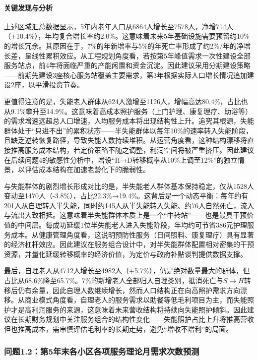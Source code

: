 \documentclass[UTF8]{ctexart}
\begin{document}
\paragraph{关键发现与分析}
上述区域汇总数据显示，5年内老年人口从6864人增长至7578人，净增714人（+10.4\%），年均复合增长率约2.0\%。这意味着未来5年基础设施需要预留约10\%的增长冗余。其原因在于，7\%的年新增率与5\%的年死亡率形成了约2\%/年的净增长差，呈线性累积效应。从工程规划角度看，若按第5年峰值需求一次性建设全部服务站点，前4年将面临严重的产能闲置和资金沉淀。因此建议采用分期建设策略——前期先建设3座核心服务站覆盖主要需求，第3年根据实际人口增长情况追加建设2座，以平滑投资节奏。

更值得注意的是，失能老人群体从624人激增至1126人，增幅高达80.4\%，占比也从9.1\%攀升至14.9\%。这意味着高成本照护服务（上门护理、康复理疗、助浴等）的需求增速远超总人口增速，人均服务成本将出现结构性上升。追究其根源，失能群体处于“只进不出”的累积状态——半失能群体以每年10\%的速率转入失能阶段，且缺乏逆转恢复路径，导致失能人数持续堆积。从运营角度看，这种结构漂移将直接推高服务成本结构，若定价策略不随之调整，利润空间将被严重挤压。因此建议在后续问题4的敏感性分析中，增设“H→D转移概率从10\%上调至12\%”的独立情景，以评估成本结构在加速老龄化下的脆弱性。

与失能群体的剧烈增长形成对比的是，半失能老人群体基本保持稳定，仅从1528人变动至1470人（-3.8\%），占比22.3\%→19.4\%。这背后是一个动态平衡：每年约有201人从自理转入半失能，同时约145人从半失能转入失能、约76人自然死亡，流入与流出大致相抵。这意味着半失能群体本质上是一个“中转站”——也是最具干预价值的中间层。每成功延缓1位半失能老人进入失能阶段，年均约可节省386元护理服务成本。从健康管理角度看，这说明预防性服务（日间照料、康复理疗）具有显著的经济杠杆效应。因此建议在服务组合设计中，对半失能群体配置相对密集的干预资源，并量化延缓转移概率的经济价值，为定价与政府补贴谈判提供数据支撑。

最后，自理老人从4712人增长至4982人（+5.7\%），仍是绝对数量最大的群体，但占比从68.6\%降至65.7\%。7\%的新增老人全部归入自理类别，抵消死亡与$S\to H$转移后仍有余量，因此自理人数继续增长，然而人口结构正在向高照护需求方向漂移。从商业模式角度看，自理老人的服务需求以助餐等低毛利项目为主，而失能照护才是高利润服务的来源，这意味着未来营收结构将持续向失能照护倾斜。因此建议在长期财务规划中关注服务组合的结构性变化——失能照护占比上升将推高营收但也推高成本，需审慎评估毛利率的长期走势，避免“增收不增利”的局面。

\subsubsection{问题1.2：第5年末各小区各项服务理论月需求次数预测}
\end{document}
